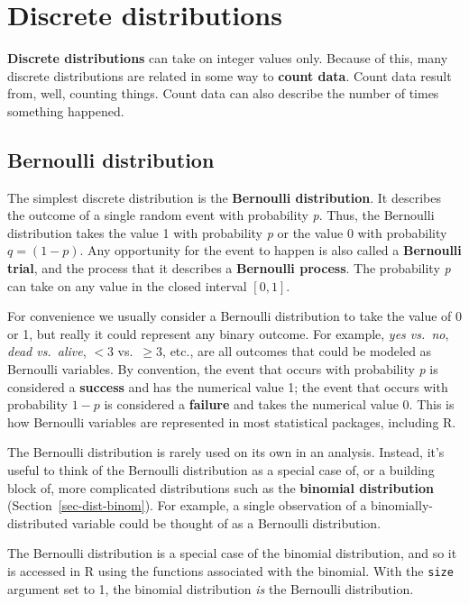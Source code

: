 \documentclass[
  13,
  letterpaper,
]{report}
\begin{document}
\section{Discrete distributions}\label{sec-dist-disc}

\textbf{Discrete distributions} can take on integer values only. Because
of this, many discrete distributions are related in some way to
\textbf{count data}. Count data result from, well, counting things.
Count data can also describe the number of times something happened.

\subsection{Bernoulli distribution}\label{sec-dist-bern}

The simplest discrete distribution is the \textbf{Bernoulli
distribution}. It describes the outcome of a single random event with
probability \emph{p}. Thus, the Bernoulli distribution takes the value 1
with probability \emph{p} or the value 0 with probability
\(q=\left(1-p\right)\). Any opportunity for the event to happen is also
called a \textbf{Bernoulli trial}, and the process that it describes a
\textbf{Bernoulli process}. The probability \emph{p} can take on any
value in the closed interval \(\left[0,1\right]\).

For convenience we usually consider a Bernoulli distribution to take the
value of 0 or 1, but really it could represent any binary outcome. For
example, \emph{yes vs.~no}, \emph{dead vs.~alive}, \(<3\) vs.~\(\ge3\),
etc., are all outcomes that could be modeled as Bernoulli variables. By
convention, the event that occurs with probability \emph{p} is
considered a \textbf{success} and has the numerical value 1; the event
that occurs with probability \(1-p\) is considered a \textbf{failure}
and takes the numerical value 0. This is how Bernoulli variables are
represented in most statistical packages, including R.

The Bernoulli distribution is rarely used on its own in an analysis.
Instead, it's useful to think of the Bernoulli distribution as a special
case of, or a building block of, more complicated distributions such as
the \textbf{binomial distribution} (Section~\ref{sec-dist-binom}). For
example, a single observation of a binomially-distributed variable could
be thought of as a Bernoulli distribution.

The Bernoulli distribution is a special case of the binomial
distribution, and so it is accessed in R using the functions associated
with the binomial. With the \texttt{size} argument set to 1, the
binomial distribution \emph{is} the Bernoulli distribution.
\end{document}
